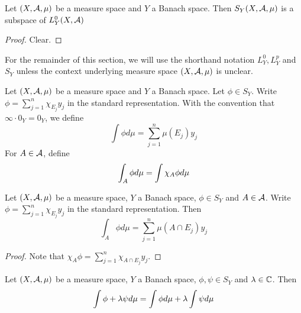 \documentclass{book}
\begin{document}
	\begin{ex}  
	Let $(X, \mathcal{A}, \mu)$ be a measure space and $Y$ a Banach space. Then $S_Y(X, \mathcal{A}, \mu)$ is a subspace of $L_Y^0(X, \mathcal{A})$
	\end{ex}
	
	\begin{proof}
	Clear.
	\end{proof}
	
	\begin{note}
	For the remainder of this section, we will use the shorthand notation $L^0_Y, L^p_Y$ and $S_Y$ unless the context underlying measure space $(X, \mathcal{A}, \mu)$ is unclear.
	\end{note}
	
	\begin{defn}  
	Let $(X, \mathcal{A}, \mu)$ be a measure space and $Y$ a Banach space. Let $\phi \in S_Y$. Write $\phi = \sum\limits_{j=1}^n\chi_{E_j}y_j$ in the standard representation. With the convention that $\infty \cdot 0_Y = 0_Y$, we define $$\int \phi d\mu = \sum\limits_{j=1}^n \mu(E_j)y_j $$ For $A \in \mathcal{A}$, define  $$\int_A \phi d \mu = \int \chi_A \phi d\mu \\$$
	\end{defn}
	
	\begin{ex}  
	Let $(X, \mathcal{A}, \mu)$ be a measure space, $Y$ a Banach space, $\phi \in S_Y$ and $A \in \mathcal{A}$. Write $\phi = \sum\limits_{j=1}^n\chi_{E_j}y_j$ in the standard representation. Then $$\int_A \phi d\mu = \sum_{j=1}^n \mu(A \cap E_j)y_j$$
	\end{ex}
	
	\begin{proof}
	Note that $\chi_A \phi = \sum\limits_{j=1}^n\chi_{A \cap E_j}y_j$.
	\end{proof}		
	
	\begin{ex}  
	Let $(X, \mathcal{A}, \mu)$ be a measure space, $Y$ a Banach space, $\phi, \psi \in S_Y$ and $\lambda \in \mathbb{C}$. Then $$\int \phi + \lambda \psi d\mu = \int \phi d \mu + \lambda \int \psi d\mu $$
	\end{ex}
	
\end{document}
